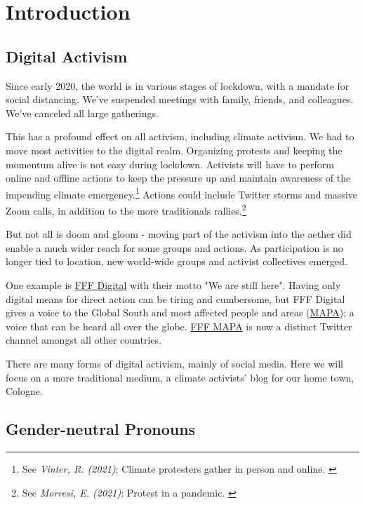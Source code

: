 %
%

\pagebreak
\section{Introduction}

\onehalfspacing

\subsection{Digital Activism}

Since early 2020, the world is in various stages of lockdown, with a mandate for social distancing. We've suspended meetings with family, friends, and colleagues. We've canceled all large gatherings.

This has a profound effect on all activism, including climate activism. We had to move most activities to the digital realm. Organizing protests and keeping the momentum alive is not easy during lockdown. Activists will have to perform online and offline actions to keep the pressure up and maintain awareness of the impending climate emergency.\footnote{See \textit{Vinter, R. (2021)}: Climate protesters gather in person and online. \cite{climateProtest}} Actions could include Twitter storms and massive Zoom calls, in addition to the more traditionals rallies.\footnote{See \textit{Morresi, E. (2021)}: Protest in a pandemic. \cite{pandemicProtest}} 

But not all is doom and gloom - moving part of the activism into the aether did enable a much wider reach for some groups and actions. As participation is no longer tied to location, new world-wide groups and activist collectives emerged. 

One example is \href{https://fffdigital.carrd.co/}{FFF Digital} with their motto "We are still here". Having only digital means for direct action can be tiring and cumbersome, but FFF Digital gives a voice to the Global South and most affected people and areas (\href{https://fridaysforfuture.org/country/mapa/}{MAPA}); a voice that can be heard all over the globe. \href{https://twitter.com/fffmapa}{FFF MAPA} is now a distinct Twitter channel amongst all other countries.

There are many forms of digital activism, mainly of social media. Here we will focus on a more traditional medium, a climate activists' blog for our home town, Cologne.

\subsection{Gender-neutral Pronouns}

